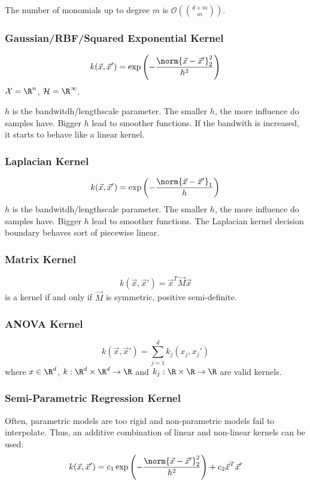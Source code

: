 The number of monomials up to degree $m$ is
$\mathcal{O}(\binom{d+m}{m})$.

\subsubsection{Gaussian/RBF/Squared Exponential Kernel}
\begin{equation*}
    k(\vec{x}, \vec{x}') = \exp\left(
        -\frac{\norm{\vec{x} - \vec{x}'}_2^2}{h^2}
    \right)
\end{equation*}
$\mathcal{X} = \R^n$,
$\mathcal{H} = \R^\infty$.

$h$ is the bandwitdh/lengthscale parameter.
The smaller $h$, the more influence do samples have.
Bigger $h$ lead to smoother functions.
If the bandwith is increased,
it starts to behave like a linear kernel.

\subsubsection{Laplacian Kernel}
\begin{equation*}
    k(\vec{x}, \vec{x}') = \exp\left(
        -\frac{\norm{\vec{x} - \vec{x}'}_1}{h}
    \right)
\end{equation*}
$h$ is the bandwitdh/lengthscale parameter.
The smaller $h$, the more influence do samples have.
Bigger $h$ lead to smoother functions.
The Laplacian kernel decision boundary behaves
sort of piecewise linear.


\subsubsection{Matrix Kernel}
\begin{equation*}
    k(\vec{x}, \vec{x}') = \vec{x}^T \vec{M} \vec{x}
\end{equation*}
is a kernel if and only if $\vec{M}$ is
symmetric, positive semi-definite.

\subsubsection{ANOVA Kernel}
\begin{equation*}
    k(\vec{x}, \vec{x}') = 
    \sum_{j=1}^d{
        k_j(x_j, x_j')
    }
\end{equation*}
where $x \in \R^d$,
$k : \R^d \times \R^d \to \R$ and
$k_j : \R \times \R \to \R$
are valid kernels.

\subsubsection{Semi-Parametric Regression Kernel}
Often, parametric models are too rigid and non-parametric
models fail to interpolate.
Thus, an additive combination of linear and non-linear
kernels can be used:
\begin{equation*}
    k(\vec{x}, \vec{x}') =
    c_1 \exp\left(
            -\frac{\norm{\vec{x} - \vec{x}'}_2^2}{h^2}
        \right) +
    c_2 \vec{x}^T \vec{x}'
\end{equation*}


